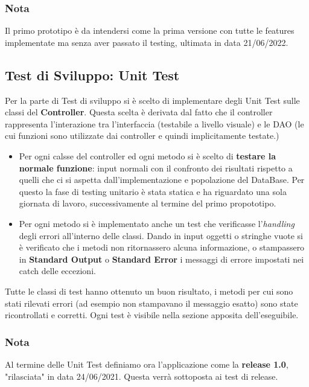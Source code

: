 \documentclass[11pt]{article}
\begin{document}
        \subsubsection*{Nota}
        Il primo prototipo è da intendersi come la prima versione con tutte le features implementate ma senza aver passato il testing, ultimata in data 21/06/2022.

        \subsection{Test di Sviluppo: Unit Test}
        Per la parte di Test di sviluppo si è scelto di implementare degli Unit Test sulle classi del \textbf{Controller}. Questa scelta è derivata dal fatto che il controller rappresenta l'interazione tra l'interfaccia (testabile a livello visuale) e le DAO (le cui funzioni sono utilizzate dai controller e quindi implicitamente testate.)\\
            \begin{itemize}
                \item Per ogni calsse del controller ed ogni metodo si è scelto di \textbf{testare la normale funzione}: input normali con il confronto dei risultati rispetto a quelli che ci si aspetta dall'implementazione e popolazione del DataBase. Per questo la fase di testing unitario è stata statica e ha riguardato una sola giornata di lavoro, successivamente al termine del primo propototipo.
                \item Per ogni metodo si è implementato anche un test che verificasse l'\textit{handling} degli errori all'interno delle classi. Dando in input oggetti o stringhe vuote si è verificato che i metodi non ritornassero alcuna informazione, o stampassero in \textbf{Standard Output} o \textbf{Standard Error} i messaggi di errore impostati nei catch delle eccezioni.
            \end{itemize}
        Tutte le classi di test hanno ottenuto un buon risultato, i metodi per cui sono stati rilevati errori (ad esempio non stampavano il messaggio esatto) sono state ricontrollati e corretti. Ogni test è visibile nella sezione apposita dell'eseguibile.
        
        \subsubsection*{Nota}
        Al termine delle Unit Test definiamo ora l'applicazione come la \textbf{release 1.0}, "rilasciata" in data 24/06/2021. Questa verrà sottoposta ai test di release.
\end{document}
